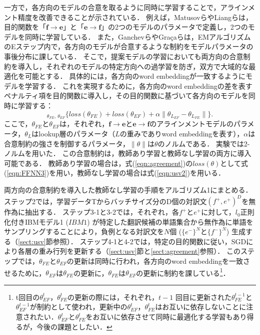 \documentclass[japanese]{jnlp_1.4}
\newcommand{\argmin}{}
\begin{document}
一方で，各方向のモデルの合意を取るように同時に学習することで，アラインメント精度を改善できることが示されている．
例えば，MatusovらやLiangらは，目的関数を「$\boldsymbol{f}\rightarrow\boldsymbol{e}$」と「$\boldsymbol{e}\rightarrow\boldsymbol{f}$」の2つのモデルのパラメータで定義し，2つのモデルを同時に学習している\cite{matusov04,liang06}．
また，GanchevらやGra\c{c}aらは，EMアルゴリズムのEステップ内で，各方向のモデルが合意するような制約をモデルパラメータの事後分布に課している\cite{gancev08,graca08}．
そこで，提案モデルの学習においても両方向の合意制約を導入し，それぞれのモデルの特定方向への過学習を防ぎ，双方で大域的な最適化を可能とする．
具体的には，各方向のword embeddingが一致するようにモデルを学習する．
これを実現するために，各方向のword embeddingの差を表すペナルティ項を目的関数に導入し，その目的関数に基づいて各方向のモデルを同時に学習する：
\begin{equation}
\label{eqn:agreement}
\argmin_{\theta_{FE},~\theta_{EF}} \bigl\{ loss(\theta_{FE}) + loss(\theta_{EF}) + \alpha \lVert \theta_{L_{EF}}-\theta_{L_{FE}} \rVert \bigr\}. 
\end{equation}
ここで，$\theta_{FE}$と$\theta_{EF}$は，それぞれ，$\boldsymbol{f} \rightarrow \boldsymbol{e}$と$\boldsymbol{e} \rightarrow \boldsymbol{f}$のアラインメントモデルのパラメータ，$\theta_{L}$はlookup層のパラメータ（$L$の重みでありword embeddingを表す），$\alpha$は合意制約の強さを制御するパラメータ，$\lVert \theta \rVert$は$\theta$のノルムである．
実験では2-ノルムを用いた．
この合意制約は，教師あり学習と教師なし学習の両方に導入可能である．
教師あり学習の場合は，式(\ref{eqn:agreement})の$loss(\theta)$として式(\ref{eqn:FFNN3})を用い，教師なし学習の場合は式(\ref{eqn:usv2})を用いる．

両方向の合意制約を導入した教師なし学習の手順をアルゴリズム1にまとめる．
ステップ2では，学習データTからバッチサイズ分のD個の対訳文$(f^{+},e^{+})^{D}$を無作為に抽出する．
ステップ3-1と3-2では，それぞれ，各$f^{+}$と$e^{+}$に対して，$l_{0}$正則化付きIBMモデル1 ($IBM1$) が特定した翻訳候補の単語集合から無作為に単語をサンプリングすることにより，負例となる対訳文を$N$個 ($\{e^{-}\}^{N}$と$\{f^{-}\}^{N}$) 生成する（\ref{sect:usv}節参照）．
ステップ4-1と4-2では，特定の目的関数に従い，SGDにより各層の重み行列を更新する（\ref{sect:usv}節と\ref{sect:agreement}参照）．
このステップでは，$\theta_{FE}$と$\theta_{EF}$の更新は同時に行われ，各方向のword embeddingを一致させるために，$\theta_{EF}$は$\theta_{FE}$の更新に，$\theta_{FE}$は$\theta_{EF}$の更新に制約を課している\footnote{t回目の$\theta_{EF}^{t}$，$\theta_{FE}^{t}$の更新の際には，それぞれ，$t-1$ 回目に更新された$\theta_{FE}^{t-1}$と$\theta_{EF}^{t-1}$が制約として使われ，更新中の$\theta_{EF}^{t}$，$\theta_{FE}^{t}$はお互いに依存しないことに注意されたい．$\theta_{EF}^{t}$と$\theta_{FE}^{t}$をお互いに依存させて同時に最適化する学習もあり得るが，今後の課題としたい．}．
\end{document}
